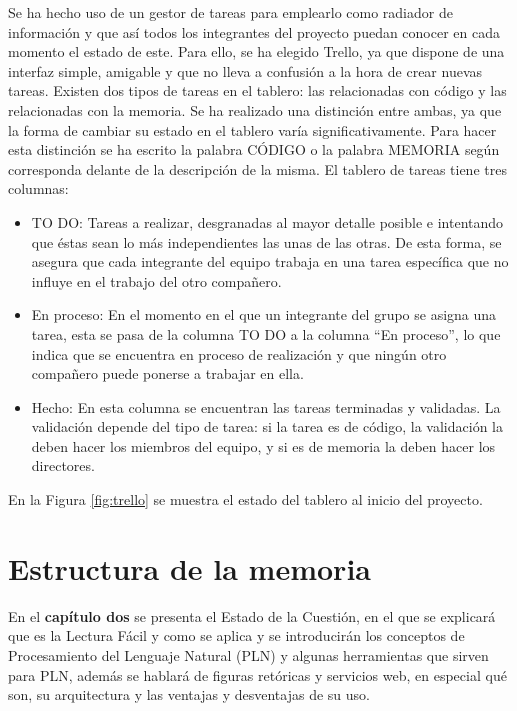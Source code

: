 Se ha hecho uso de un gestor de tareas para emplearlo como radiador de información y que así todos los integrantes del proyecto puedan conocer en cada momento el estado de este. Para ello, se ha elegido Trello, ya que dispone de una interfaz simple, amigable y que no lleva a confusión a la hora de crear nuevas tareas.
Existen dos tipos de tareas en el tablero: las relacionadas con código y las relacionadas con la memoria. Se ha realizado una distinción entre ambas, ya que la forma de cambiar su estado en el tablero varía significativamente. Para hacer esta distinción se ha escrito la palabra CÓDIGO o la palabra MEMORIA según corresponda delante de la descripción de la misma. El tablero de tareas tiene tres columnas:
\begin{itemize}
	\item TO DO: Tareas a realizar, desgranadas al mayor detalle posible e intentando que éstas sean lo más independientes las unas de las otras. De esta forma, se asegura que cada integrante del equipo trabaja en una tarea específica que no influye en el trabajo del otro compañero.
	\item En proceso: En el momento en el que un integrante del grupo se asigna una tarea, esta se pasa de la columna TO DO a la columna ``En proceso'', lo que indica que se encuentra en proceso de realización y que ningún otro compañero puede ponerse a trabajar en ella. 
	\item Hecho: En esta columna se encuentran las tareas terminadas y validadas. La validación depende del tipo de tarea: si la tarea es de código, la validación la deben hacer los miembros del equipo, y si es de memoria la deben hacer los directores.
	
\end{itemize}

En la Figura \ref{fig:trello} se muestra el estado del tablero al inicio del proyecto.



\section{Estructura de la memoria}
\label{cap:sec:estructuramemoria}


En el \textbf{capítulo dos} se presenta el Estado de la Cuestión, en el que se explicará que es la Lectura Fácil y como se aplica y se introducirán los conceptos de Procesamiento del Lenguaje Natural (PLN) y algunas herramientas que sirven para PLN, además se hablará de figuras retóricas y servicios web, en especial qué son, su arquitectura y las ventajas y desventajas de su uso.


